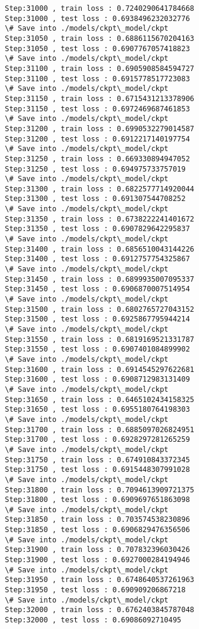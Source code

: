 \documentclass[11pt]{article}
\begin{document}
\begin{Verbatim}[commandchars=\\\{\}]
Step:31000 , train loss : 0.7240290641784668
Step:31000 , test loss : 0.6938496232032776
\# Save into ./models/ckpt\_model/ckpt
Step:31050 , train loss : 0.6886115670204163
Step:31050 , test loss : 0.6907767057418823
\# Save into ./models/ckpt\_model/ckpt
Step:31100 , train loss : 0.6905908584594727
Step:31100 , test loss : 0.6915778517723083
\# Save into ./models/ckpt\_model/ckpt
Step:31150 , train loss : 0.6715431213378906
Step:31150 , test loss : 0.6972469687461853
\# Save into ./models/ckpt\_model/ckpt
Step:31200 , train loss : 0.6990532279014587
Step:31200 , test loss : 0.6912217140197754
\# Save into ./models/ckpt\_model/ckpt
Step:31250 , train loss : 0.669330894947052
Step:31250 , test loss : 0.694975733757019
\# Save into ./models/ckpt\_model/ckpt
Step:31300 , train loss : 0.6822577714920044
Step:31300 , test loss : 0.691307544708252
\# Save into ./models/ckpt\_model/ckpt
Step:31350 , train loss : 0.6738222241401672
Step:31350 , test loss : 0.6907829642295837
\# Save into ./models/ckpt\_model/ckpt
Step:31400 , train loss : 0.6856510043144226
Step:31400 , test loss : 0.6912757754325867
\# Save into ./models/ckpt\_model/ckpt
Step:31450 , train loss : 0.6899935007095337
Step:31450 , test loss : 0.6906870007514954
\# Save into ./models/ckpt\_model/ckpt
Step:31500 , train loss : 0.6802765727043152
Step:31500 , test loss : 0.6925867795944214
\# Save into ./models/ckpt\_model/ckpt
Step:31550 , train loss : 0.6819169521331787
Step:31550 , test loss : 0.6907401084899902
\# Save into ./models/ckpt\_model/ckpt
Step:31600 , train loss : 0.6914545297622681
Step:31600 , test loss : 0.6908712983131409
\# Save into ./models/ckpt\_model/ckpt
Step:31650 , train loss : 0.6465102434158325
Step:31650 , test loss : 0.6955180764198303
\# Save into ./models/ckpt\_model/ckpt
Step:31700 , train loss : 0.6885097026824951
Step:31700 , test loss : 0.6928297281265259
\# Save into ./models/ckpt\_model/ckpt
Step:31750 , train loss : 0.674910843372345
Step:31750 , test loss : 0.6915448307991028
\# Save into ./models/ckpt\_model/ckpt
Step:31800 , train loss : 0.7094613909721375
Step:31800 , test loss : 0.6909697651863098
\# Save into ./models/ckpt\_model/ckpt
Step:31850 , train loss : 0.703574538230896
Step:31850 , test loss : 0.6906829476356506
\# Save into ./models/ckpt\_model/ckpt
Step:31900 , train loss : 0.707832396030426
Step:31900 , test loss : 0.6927000284194946
\# Save into ./models/ckpt\_model/ckpt
Step:31950 , train loss : 0.6748640537261963
Step:31950 , test loss : 0.690909206867218
\# Save into ./models/ckpt\_model/ckpt
Step:32000 , train loss : 0.6762403845787048
Step:32000 , test loss : 0.69086092710495

\end{Verbatim}
\end{document}
